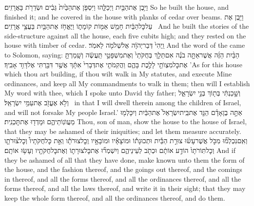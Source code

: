 {וַיִּ֥בֶן אֶת\maqqaf הַבַּ֖יִת וַיְכַלֵּ֑הוּ וַיִּסְפֹּ֤ן אֶת\maqqaf הַבַּ֙יִת֙ גֵּבִ֔ים וּשְׂדֵרֹ֖ת בָּאֲרָזִֽים׃}
{So he built the house, and finished it; and he covered in the house with planks of cedar over beams.}
{וַיִּ֤בֶן אֶת\maqqaf {} עַל\maqqaf כׇּל\maqqaf הַבַּ֔יִת חָמֵ֥שׁ אַמּ֖וֹת קוֹמָת֑וֹ וַיֶּאֱחֹ֥ז אֶת\maqqaf הַבַּ֖יִת בַּעֲצֵ֥י אֲרָזִֽים׃ \petucha }
{And he built the stories of the side-structure against all the house, each five cubits high; and they rested on the house with timber of cedar.}
{וַֽיְהִי֙ דְּבַר\maqqaf יְהֹוָ֔ה אֶל\maqqaf שְׁלֹמֹ֖ה לֵאמֹֽר׃}
{And the word of the \lord\space came to Solomon, saying:}
{הַבַּ֨יִת הַזֶּ֜ה אֲשֶׁר\maqqaf אַתָּ֣ה בֹנֶ֗ה אִם\maqqaf תֵּלֵ֤ךְ בְּחֻקֹּתַי֙ וְאֶת\maqqaf מִשְׁפָּטַ֣י תַּֽעֲשֶׂ֔ה וְשָֽׁמַרְתָּ֥ אֶת\maqqaf כׇּל\maqqaf מִצְוֺתַ֖י לָלֶ֣כֶת בָּהֶ֑ם וַהֲקִמֹתִ֤י אֶת\maqqaf דְּבָרִי֙ אִתָּ֔ךְ אֲשֶׁ֥ר דִּבַּ֖רְתִּי אֶל\maqqaf דָּוִ֥ד אָבִֽיךָ׃}
{’As for this house which thou art building, if thou wilt walk in My statutes, and execute Mine ordinances, and keep all My commandments to walk in them; then will I establish My word with thee, which I spoke unto David thy father;}
{וְשָׁ֣כַנְתִּ֔י בְּת֖וֹךְ בְּנֵ֣י יִשְׂרָאֵ֑ל וְלֹ֥א אֶעֱזֹ֖ב אֶת\maqqaf עַמִּ֥י יִשְׂרָאֵֽל׃ \petucha }
{in that I will dwell therein among the children of Israel, and will not forsake My people Israel.’}
\newperek
{}
\label{haft_20}
\setcounter{chap}{43}
\setcounter{verse}{10}
{אַתָּ֣ה בֶן\maqqaf אָדָ֗ם הַגֵּ֤ד אֶת\maqqaf בֵּֽית\maqqaf יִשְׂרָאֵל֙ אֶת\maqqaf הַבַּ֔יִת וְיִכָּלְמ֖וּ מֵעֲוֺנֽוֹתֵיהֶ֑ם וּמָדְד֖וּ אֶת\maqqaf תׇּכְנִֽית׃}
{Thou, son of man, show the house to the house of Israel, that they may be ashamed of their iniquities; and let them measure accurately.}
{וְאִֽם\maqqaf נִכְלְמ֞וּ מִכֹּ֣ל אֲשֶׁר\maqqaf עָשׂ֗וּ צוּרַ֣ת הַבַּ֡יִת וּתְכוּנָת֡וֹ וּמוֹצָאָ֡יו וּמוֹבָאָ֣יו וְֽכׇל\maqqaf צוּרֹתָ֡ו וְאֵ֣ת כׇּל\maqqaf חֻקֹּתָיו֩ וְכׇל\maqqaf צ֨וּרֹתָ֤ו וְכׇל\maqqaf תּֽוֹרֹתָו֙ הוֹדַ֣ע אוֹתָ֔ם וּכְתֹ֖ב לְעֵינֵיהֶ֑ם וְיִשְׁמְר֞וּ אֶת\maqqaf כׇּל\maqqaf צוּרָת֛וֹ וְאֶת\maqqaf כׇּל\maqqaf חֻקֹּתָ֖יו וְעָשׂ֥וּ אוֹתָֽם׃}
{And if they be ashamed of all that they have done, make known unto them the form of the house, and the fashion thereof, and the goings out thereof, and the comings in thereof, and all the forms thereof, and all the ordinances thereof, and all the forms thereof, and all the laws thereof, and write it in their sight; that they may keep the whole form thereof, and all the ordinances thereof, and do them.}

